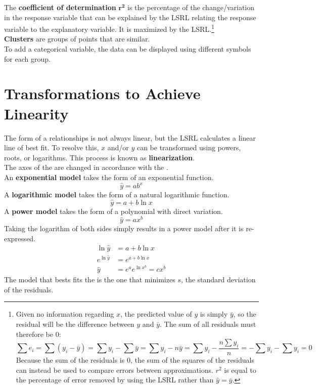 \documentclass[../AP_Statistics.tex]{subfiles}
\begin{document}
			The \textbf{coefficient of determination} $\bm{r^2}$ is the percentage of the change/variation in the response variable that can be explained by the LSRL relating the response variable to the explanatory variable. It is maximized by the LSRL.\footnote{Given no information regarding $x$, the predicted value of $y$ is simply $\bar{y}$, so the residual will be the difference between $y$ and $\bar{y}$. The sum of all residuals must therefore be 0:\[\sum e_i = \sum(y_i - \bar{y}) = \sum y_i - \sum \bar{y} = \sum y_i - n\bar{y} = \sum y_i - \frac{n\sum 
			y_i}{n} = - \sum y_i - \sum y_i = 0\]Because the sum of the residuals is 0, the sum of the squares of the residuals can instead be used to compare errors between approximations. $r^2$ is equal to the percentage of error removed by using the LSRL rather than $\hat{y} = \bar{y}$.} \\
			\textbf{Clusters}  are groups of points that are similar. \\
			To add a categorical variable, the data can be displayed using different symbols for each group. \\
		\section{Transformations to Achieve Linearity}
			The form of a relationships is not always linear, but the LSRL calculates a linear line of best fit. To resolve this, $x$ and/or $y$ can be transformed using powers, roots, or logarithms. This process is known as \textbf{linearization}. \\
			The axes of the  are changed in accordance with the . \\
			An \textbf{exponential model} takes the form of an exponential function.
			\[\hat{y} = ab^x\]
			A \textbf{logarithmic model} takes the form of a natural logarithmic function.
			\[\hat{y} = a + b\ln x\]
			A \textbf{power model} takes the form of a polynomial with direct variation.
			\[\hat{y} = ax^b\]
			Taking the logarithm of both sides simply results in a power model after it is re-expressed.
			\begin{align*}
				\ln \hat{y} &= a + b\ln x \\
				e^{\ln \hat{y}} &= e^{a + b\ln x} \\
				\hat{y} &= e^a e^{\ln x^b} = cx^b
			\end{align*}
			The model that bests fits the  is the one that minimizes $s$, the standard deviation of the residuals.
\end{document}
